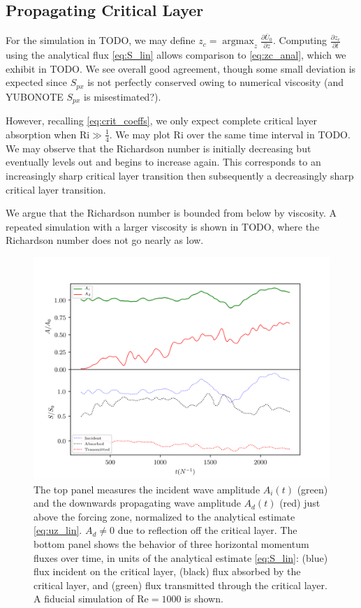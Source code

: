 \documentclass[
        fleqn,
        usenatbib,
    ]{mnras}
\newcommand*{\pd}[2]{\frac{\partial#1}{\partial#2}}
\DeclareMathOperator*{\argmax}{argmax}
\begin{document}
\subsection{Propagating Critical Layer}

For the simulation in TODO, we may define $z_c = \argmax_z
\pd{\bar{U}_0}{z}$. Computing $\pd{z_c}{t}$ using the analytical flux
\autoref{eq:S_lin} allows comparison to \autoref{eq:zc_anal}, which we exhibit
in TODO\@. We see overall good agreement, though some small
deviation is expected since $S_{px}$ is not perfectly conserved owing to
numerical viscosity (and YUBONOTE $S_{px}$ is misestimated?).

However, recalling \autoref{eq:crit_coeffs}, we only expect complete critical
layer absorption when $\mathrm{Ri} \gg \frac{1}{4}$. We may plot $\mathrm{Ri}$
over the same time interval in TODO\@. We may observe that the
Richardson number is initially decreasing but eventually levels out and
begins to increase again. This corresponds to an increasingly sharp critical
layer transition then subsequently a decreasingly sharp critical layer
transition.

We argue that the Richardson number is bounded from below by viscosity. A
repeated simulation with a larger viscosity is shown in TODO,
where the Richardson number does not go nearly as low.

\begin{figure}[t]
    \centering
    \includegraphics[width=\columnwidth]{plots/nl_f_amps.png}
    \caption{The top panel measures the incident wave amplitude $A_i(t)$ (green)
    and the downwards propagating wave amplitude $A_d(t)$ (red) just above the
    forcing zone, normalized to the analytical estimate \autoref{eq:uz_lin}.
    $A_d \neq 0$ due to reflection off the critical layer. The bottom panel
    shows the behavior of three horizontal momentum fluxes over time, in units
    of the analytical estimate \autoref{eq:S_lin}: (blue) flux incident on the
    critical layer, (black) flux absorbed by the critical layer, and (green)
    flux transmitted through the critical layer. A fiducial simulation of
    $\mathrm{Re} = 1000$ is shown.}\label{fig:nl_amps}
\end{figure}
\end{document}
